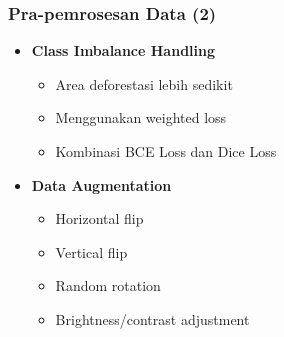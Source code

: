 \documentclass{beamer}
\begin{document}
	\begin{frame}
		\frametitle{Pra-pemrosesan Data (2)}
		
		\begin{itemize}
			
			\item \textbf{Class Imbalance Handling}
			\begin{itemize}
				\item Area deforestasi lebih sedikit
				\item Menggunakan weighted loss
				\item Kombinasi BCE Loss dan Dice Loss
			\end{itemize}
			
			\vspace{0.2cm}
			
			\item \textbf{Data Augmentation}
			\begin{itemize}
				\item Horizontal flip
				\item Vertical flip
				\item Random rotation
				\item Brightness/contrast adjustment
			\end{itemize}
			
		\end{itemize}
		
	\end{frame}
	
\end{document}
